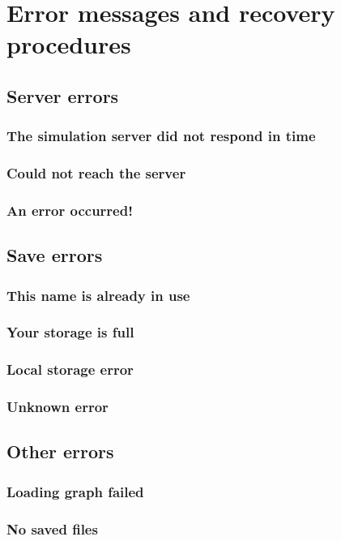 \chapter{Error messages and recovery procedures}

\section {Server errors}

\subsection{The simulation server did not respond in time}

\subsection{Could not reach the server}

\subsection{An error occurred!}

\section{Save errors}

\subsection{This name is already in use}

\subsection{Your storage is full}

\subsection{Local storage error}

\subsection{Unknown error}

\section{Other errors}

\subsection{Loading graph failed}

\subsection{No saved files}


